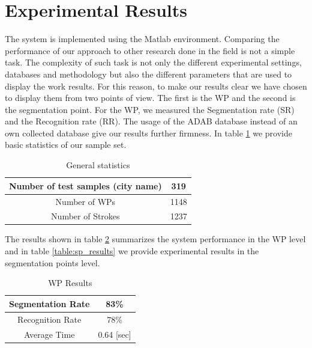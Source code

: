 \documentclass[journal,compsoc]{IEEEtran}
\begin{document}

\section{Experimental Results}
\label{sec:results}
The system is implemented using the Matlab environment. Comparing the performance of our approach to other research done in the field is not a simple task. The complexity of such task is not only the different experimental settings, databases and methodology but also the different parameters that are used to display the work results. For this reason, to make our results clear we have chosen to display them from two points of view. The first is the WP and the second is the segmentation point. For the WP, we measured the Segmentation rate (SR) and the Recognition rate (RR).  The usage of the ADAB database instead of an own collected database give our results further firmness. In table \ref{table:general_stats} we provide basic statistics of our sample set.\\

\begin{table}[h]
\caption{General statistics}
\begin{tabular}{ | c | c | }
  \hline
  Number of test samples (city name) & 319 \\
  \hline
  Number of WPs & 1148 \\
  \hline
  Number of Strokes & 1237 \\
  \hline
\end{tabular}
\centering
\label{table:general_stats} 
\end{table}

The results shown in table \ref{table:wp_results} summarizes the system performance in the WP level and in table \ref{table:sp_results} we provide experimental results in the segmentation points level. 

\begin{table}[h]
\caption{WP Results}
\begin{tabular}{ | c | c | }
  \hline
  Segmentation Rate &  83\% \\ 
 \hline
  Recognition Rate &  78\% \\ 
 \hline
  Average Time & 0.64 [sec] \\
\hline
\end{tabular}
\centering
\label{table:wp_results} 
\end{table}
\end{document}
